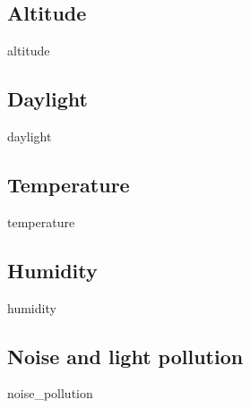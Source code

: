 \subsection{Altitude}
{altitude}

\subsection{Daylight}
{daylight}

\subsection{Temperature}
{temperature}

\subsection{Humidity}
{humidity}

\subsection{Noise and light pollution}
{noise_pollution}

